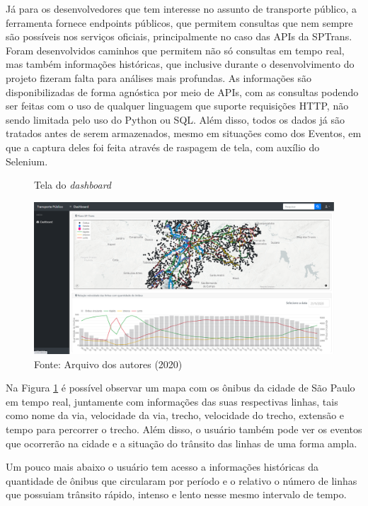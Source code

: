 \par Já para os desenvolvedores que tem interesse no assunto de transporte público, a ferramenta fornece endpoints públicos, que permitem consultas que nem sempre são possíveis nos serviços oficiais, principalmente no caso das APIs da SPTrans. Foram desenvolvidos caminhos que permitem não só consultas em tempo real, mas também informações históricas, que inclusive durante o desenvolvimento do projeto fizeram falta para análises mais profundas. As informações são disponibilizadas de forma agnóstica por meio de APIs, com as consultas podendo ser feitas com o uso de qualquer linguagem que suporte requisições HTTP, não sendo limitada pelo uso do Python ou SQL. Além disso, todos os dados já são tratados antes de serem armazenados, mesmo em situações como dos Eventos, em que a captura deles foi feita através de raspagem de tela, com auxílio do Selenium.
\begin{figure}[H]
    \centering
    \caption{Tela do \textit{dashboard}}
    \includegraphics[width=1.0\linewidth]{Imagens/dashboard2.png}
    \caption*{Fonte: Arquivo dos autores (2020)}
    \label{telaDashboard2}
\end{figure}
\indent
\par Na Figura \ref{telaDashboard2} é possível observar um mapa com os ônibus da cidade de São Paulo em tempo real, juntamente com informações das suas respectivas linhas, tais como nome da via, velocidade da via, trecho, velocidade do trecho, extensão e tempo para percorrer o trecho. Além disso, o usuário também pode ver os eventos que ocorrerão na cidade e a situação do trânsito das linhas de uma forma ampla.
\indent
\par Um pouco mais abaixo o usuário tem acesso a informações históricas da quantidade de ônibus que circularam por período e o relativo o número de linhas que possuiam trânsito rápido, intenso e lento nesse mesmo intervalo de tempo.
